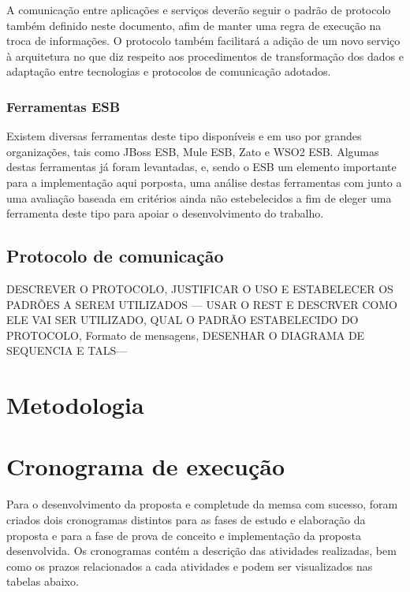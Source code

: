 A comunicação entre aplicações e serviços deverão seguir o padrão de protocolo também definido neste documento, afim de manter uma regra de execução na troca de informações. O protocolo também facilitará a adição de um novo serviço à arquitetura no que diz respeito aos procedimentos de transformação dos dados e adaptação entre tecnologias e protocolos de comunicação adotados.

\subsubsection{Ferramentas ESB}
Existem diversas ferramentas deste tipo disponíveis e em uso por grandes organizações, tais como JBoss ESB, Mule ESB, Zato e WSO2 ESB. Algumas destas ferramentas já foram levantadas, e, sendo o ESB um elemento importante para a implementação aqui porposta, uma análise destas ferramentas com junto a uma avaliação baseada em critérios ainda não estebelecidos a fim de eleger uma ferramenta deste tipo para apoiar o desenvolvimento do trabalho.

\subsection{Protocolo de comunicação}

{DESCREVER O PROTOCOLO, JUSTIFICAR O USO E ESTABELECER OS PADRÕES A SEREM UTILIZADOS}
--- USAR O REST E DESCRVER COMO ELE VAI SER UTILIZADO, QUAL O PADRÃO ESTABELECIDO DO PROTOCOLO, Formato de mensagens,  DESENHAR O DIAGRAMA DE SEQUENCIA E TALS---

\section{Metodologia}


\section{Cronograma de execução}
Para o desenvolvimento da proposta e completude da memsa com sucesso, foram criados dois cronogramas distintos para as fases de estudo e elaboração da proposta e para a fase de prova de conceito e implementação da proposta desenvolvida. Os cronogramas contém a descrição das atividades realizadas, bem como os prazos relacionados a cada atividades e podem ser visualizados nas tabelas abaixo.


